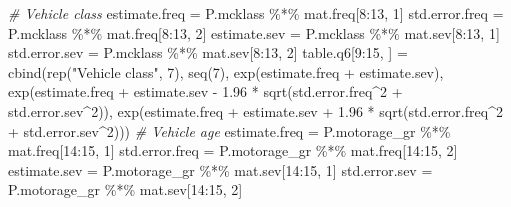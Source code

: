 \documentclass[
]{article}
\newenvironment{Shaded}{\begin{snugshade}}{\end{snugshade}}
\newcommand{\CommentTok}[1]{\textcolor[rgb]{0.56,0.35,0.01}{\textit{#1}}}
\newcommand{\DecValTok}[1]{\textcolor[rgb]{0.00,0.00,0.81}{#1}}
\newcommand{\FloatTok}[1]{\textcolor[rgb]{0.00,0.00,0.81}{#1}}
\newcommand{\FunctionTok}[1]{\textcolor[rgb]{0.00,0.00,0.00}{#1}}
\newcommand{\NormalTok}[1]{#1}
\newcommand{\OtherTok}[1]{\textcolor[rgb]{0.56,0.35,0.01}{#1}}
\newcommand{\SpecialCharTok}[1]{\textcolor[rgb]{0.00,0.00,0.00}{#1}}
\newcommand{\StringTok}[1]{\textcolor[rgb]{0.31,0.60,0.02}{#1}}
\begin{document}
\begin{Shaded}
\begin{Highlighting}[]
\CommentTok{\# Vehicle class}
\NormalTok{estimate.freq }\OtherTok{=}\NormalTok{ P.mcklass }\SpecialCharTok{\%*\%}\NormalTok{ mat.freq[}\DecValTok{8}\SpecialCharTok{:}\DecValTok{13}\NormalTok{, }\DecValTok{1}\NormalTok{]}
\NormalTok{std.error.freq }\OtherTok{=}\NormalTok{ P.mcklass }\SpecialCharTok{\%*\%}\NormalTok{ mat.freq[}\DecValTok{8}\SpecialCharTok{:}\DecValTok{13}\NormalTok{, }\DecValTok{2}\NormalTok{]}
\NormalTok{estimate.sev }\OtherTok{=}\NormalTok{ P.mcklass }\SpecialCharTok{\%*\%}\NormalTok{ mat.sev[}\DecValTok{8}\SpecialCharTok{:}\DecValTok{13}\NormalTok{, }\DecValTok{1}\NormalTok{]}
\NormalTok{std.error.sev }\OtherTok{=}\NormalTok{ P.mcklass }\SpecialCharTok{\%*\%}\NormalTok{ mat.sev[}\DecValTok{8}\SpecialCharTok{:}\DecValTok{13}\NormalTok{, }\DecValTok{2}\NormalTok{]}
\NormalTok{table.q6[}\DecValTok{9}\SpecialCharTok{:}\DecValTok{15}\NormalTok{, ] }\OtherTok{=} \FunctionTok{cbind}\NormalTok{(}\FunctionTok{rep}\NormalTok{(}\StringTok{"Vehicle class"}\NormalTok{, }\DecValTok{7}\NormalTok{), }\FunctionTok{seq}\NormalTok{(}\DecValTok{7}\NormalTok{), }\FunctionTok{exp}\NormalTok{(estimate.freq }\SpecialCharTok{+}\NormalTok{ estimate.sev), }
                   \FunctionTok{exp}\NormalTok{(estimate.freq }\SpecialCharTok{+}\NormalTok{ estimate.sev }\SpecialCharTok{{-}} \FloatTok{1.96} \SpecialCharTok{*} \FunctionTok{sqrt}\NormalTok{(std.error.freq}\SpecialCharTok{\^{}}\DecValTok{2} \SpecialCharTok{+}\NormalTok{ std.error.sev}\SpecialCharTok{\^{}}\DecValTok{2}\NormalTok{)), }
                   \FunctionTok{exp}\NormalTok{(estimate.freq }\SpecialCharTok{+}\NormalTok{ estimate.sev }\SpecialCharTok{+} \FloatTok{1.96} \SpecialCharTok{*} \FunctionTok{sqrt}\NormalTok{(std.error.freq}\SpecialCharTok{\^{}}\DecValTok{2} \SpecialCharTok{+}\NormalTok{ std.error.sev}\SpecialCharTok{\^{}}\DecValTok{2}\NormalTok{)))}
\CommentTok{\# Vehicle age}
\NormalTok{estimate.freq }\OtherTok{=}\NormalTok{ P.motorage\_gr }\SpecialCharTok{\%*\%}\NormalTok{ mat.freq[}\DecValTok{14}\SpecialCharTok{:}\DecValTok{15}\NormalTok{, }\DecValTok{1}\NormalTok{]}
\NormalTok{std.error.freq }\OtherTok{=}\NormalTok{ P.motorage\_gr }\SpecialCharTok{\%*\%}\NormalTok{ mat.freq[}\DecValTok{14}\SpecialCharTok{:}\DecValTok{15}\NormalTok{, }\DecValTok{2}\NormalTok{]}
\NormalTok{estimate.sev }\OtherTok{=}\NormalTok{ P.motorage\_gr }\SpecialCharTok{\%*\%}\NormalTok{ mat.sev[}\DecValTok{14}\SpecialCharTok{:}\DecValTok{15}\NormalTok{, }\DecValTok{1}\NormalTok{]}
\NormalTok{std.error.sev }\OtherTok{=}\NormalTok{ P.motorage\_gr }\SpecialCharTok{\%*\%}\NormalTok{ mat.sev[}\DecValTok{14}\SpecialCharTok{:}\DecValTok{15}\NormalTok{, }\DecValTok{2}\NormalTok{]}

\end{Highlighting}
\end{Shaded}
\end{document}
